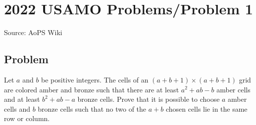 \documentclass[12pt]{article}
\begin{document}
\section*{{2022 USAMO Problems/Problem 1}}
Source: AoPS Wiki

\subsection*{Problem}
Let $a$ and $b$ be positive integers. The cells of an $(a+b+1)\times (a+b+1)$ grid are colored amber and bronze such that there are at least $a^2+ab-b$ amber cells and at least $b^2+ab-a$ bronze cells. Prove that it is possible to choose $a$ amber cells and $b$ bronze cells such that no two of the $a+b$ chosen cells lie in the same row or column.
\end{document}
